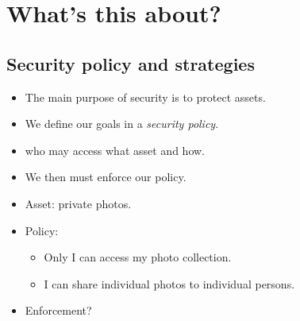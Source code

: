 \begin{frame}
  \titlepage{}
\end{frame}

\begin{frame}
	\tableofcontents
\end{frame}





\section{What's this about?}

\subsection{Security policy and strategies}

\begin{frame}
  \begin{itemize}
    \item The main purpose of security is to protect assets.

      \pause

    \item We define our goals in a \emph{security policy}.
    \item \Eg who may access what asset and how.

      \pause

    \item We then must enforce our policy.
  \end{itemize}
\end{frame}

\begin{frame}
  \begin{example}
    \begin{itemize}
      \item Asset: private photos.

      \item Policy:
        \begin{itemize}
          \item Only I can access my photo collection.
          \item I can share individual photos to individual persons.
        \end{itemize}

        \pause

      \item Enforcement?
    \end{itemize}
  \end{example}
\end{frame}


